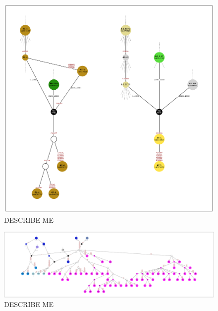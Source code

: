 \documentclass{article}
\begin{document}
\begin{figure} \centering
\includegraphics[width=\textwidth]{figures/Pango_XD_gisaid_large_graph.pdf}
\caption{\label{fig:pango_XD_gisaid_graph}  DESCRIBE ME}
\end{figure}

\begin{figure} \centering
\includegraphics[width=\textwidth]{figures/Pango_XB_gisaid_large_graph.pdf}
\caption{\label{fig:pango_XB_gisaid_graph}  DESCRIBE ME}
\end{figure}
\end{document}
